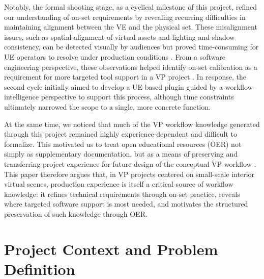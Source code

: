 \documentclass[conference]{IEEEtran}
\begin{document}
Notably, the formal shooting stage, as a cyclical milestone of this project, refined our understanding of on-set requirements by revealing recurring difficulties in maintaining alignment between the VE and the physical set. These misalignment issues, such as spatial alignment of virtual assets and lighting and shadow consistency, can be detected visually by audiences but proved time-consuming for UE operators to resolve under production conditions \cite{colorLED}. From a software engineering perspective, these observations helped identify on-set calibration as a requirement for more targeted tool support in a VP project \cite{colorreproductionLED}. In response, the second cycle initially aimed to develop a UE-based plugin guided by a workflow-intelligence perspective to support this process, although time constraints ultimately narrowed the scope to a single, more concrete function.

At the same time, we noticed that much of the VP workflow knowledge generated through this project remained highly experience-dependent and difficult to formalize. This motivated us to treat open educational resources (OER) not simply as supplementary documentation, but as a means of preserving and transferring project experience for future design of the conceptual VP workflow \cite{UNESCO2019OER}. This paper therefore argues that, in VP projects centered on small-scale interior virtual scenes, production experience is itself a critical source of workflow knowledge: it refines technical requirements through on-set practice, reveals where targeted software support is most needed, and motivates the structured preservation of such knowledge through OER.


\section{Project Context and Problem Definition}
\end{document}
